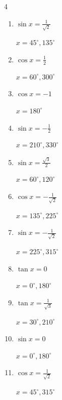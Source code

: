 \begin{multicols}{4}
\begin{enumerate}
        $\displaystyle x = 90^{\circ} , 270^{\circ}$

  \item $\displaystyle \sin{x}  = \frac{1}{\sqrt{2}}$

        $\displaystyle x = 45^{\circ} , 135^{\circ}$

\columnbreak %

  \item $\displaystyle \cos{x}  = \frac{1}{2}$

        $\displaystyle x = 60^{\circ} , 300^{\circ}$

  \item $\displaystyle \cos{x}  = -1$

        $\displaystyle x = 180^{\circ}$

  \item $\displaystyle \sin{x}  = -\frac{1}{2}$

        $\displaystyle x = 210^{\circ} , 330^{\circ}$

  \item $\displaystyle \sin{x}  = \frac{\sqrt{3}}{2}$

        $\displaystyle x = 60^{\circ} , 120^{\circ}$

  \item $\displaystyle \cos{x}  = -\frac{1}{\sqrt{2}}$

        $\displaystyle x = 135^{\circ} , 225^{\circ}$

  \item $\displaystyle \sin{x}  = -\frac{1}{\sqrt{2}}$

        $\displaystyle x = 225^{\circ} , 315^{\circ}$

  \item $\displaystyle \tan{x}  = 0$

        $\displaystyle x = 0^{\circ} , 180^{\circ}$

  \item $\displaystyle \tan{x}  = \frac{1}{\sqrt{3}}$

        $\displaystyle x = 30^{\circ} , 210^{\circ}$

  \item $\displaystyle \sin{x}  = 0$

        $\displaystyle x = 0^{\circ} , 180^{\circ}$

  \item $\displaystyle \cos{x}  = \frac{1}{\sqrt{2}}$

        $\displaystyle x = 45^{\circ} , 315^{\circ}$


\end{enumerate}
\end{multicols}
